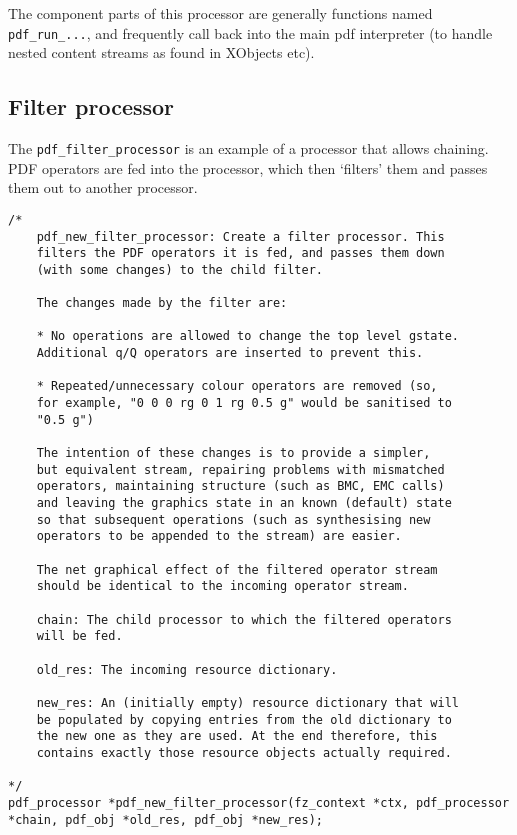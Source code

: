 \documentclass[oneside]{book}
\begin{document}
The component parts of this processor are generally functions named \texttt{pdf\_run\_...}, and frequently call back into the main pdf interpreter (to handle nested content streams as found in XObjects etc).

\subsection{Filter processor}

The \texttt{pdf\_filter\_processor} is an example of a processor that allows chaining. PDF operators are fed into the processor, which then `filters' them and passes them out to another processor.

\begin{lstlisting}
/*
	pdf_new_filter_processor: Create a filter processor. This
	filters the PDF operators it is fed, and passes them down
	(with some changes) to the child filter.

	The changes made by the filter are:

	* No operations are allowed to change the top level gstate.
	Additional q/Q operators are inserted to prevent this.

	* Repeated/unnecessary colour operators are removed (so,
	for example, "0 0 0 rg 0 1 rg 0.5 g" would be sanitised to
	"0.5 g")

	The intention of these changes is to provide a simpler,
	but equivalent stream, repairing problems with mismatched
	operators, maintaining structure (such as BMC, EMC calls)
	and leaving the graphics state in an known (default) state
	so that subsequent operations (such as synthesising new
	operators to be appended to the stream) are easier.

	The net graphical effect of the filtered operator stream
	should be identical to the incoming operator stream.

	chain: The child processor to which the filtered operators
	will be fed.

	old_res: The incoming resource dictionary.

	new_res: An (initially empty) resource dictionary that will
	be populated by copying entries from the old dictionary to
	the new one as they are used. At the end therefore, this
	contains exactly those resource objects actually required.

*/
pdf_processor *pdf_new_filter_processor(fz_context *ctx, pdf_processor *chain, pdf_obj *old_res, pdf_obj *new_res);
\end{lstlisting}
\end{document}
